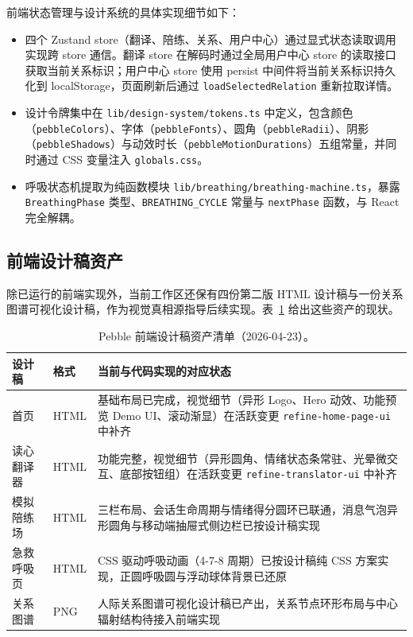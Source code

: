 前端状态管理与设计系统的具体实现细节如下：

\begin{itemize}
  \item 四个 Zustand store（翻译、陪练、关系、用户中心）通过显式状态读取调用实现跨 store 通信。翻译 store 在解码时通过全局用户中心 store 的读取接口获取当前关系标识；用户中心 store 使用 persist 中间件将当前关系标识持久化到 localStorage，页面刷新后通过 \texttt{loadSelectedRelation} 重新拉取详情。
  \item 设计令牌集中在 \texttt{lib/design-system/tokens.ts} 中定义，包含颜色（\texttt{pebbleColors}）、字体（\texttt{pebbleFonts}）、圆角（\texttt{pebbleRadii}）、阴影（\texttt{pebbleShadows}）与动效时长（\texttt{pebbleMotionDurations}）五组常量，并同时通过 CSS 变量注入 \texttt{globals.css}。
  \item 呼吸状态机提取为纯函数模块 \texttt{lib/breathing/breathing-machine.ts}，暴露 \texttt{BreathingPhase} 类型、\texttt{BREATHING\_CYCLE} 常量与 \texttt{nextPhase} 函数，与 React 完全解耦。
\end{itemize}

\subsection{前端设计稿资产}

除已运行的前端实现外，当前工作区还保有四份第二版 HTML 设计稿与一份关系图谱可视化设计稿，作为视觉真相源指导后续实现。表~\ref{tab:pebble-design-assets} 给出这些资产的现状。

\begin{table}[H]
  \centering
  \caption{Pebble 前端设计稿资产清单（2026-04-23）。}
  \label{tab:pebble-design-assets}
  \begin{tabularx}{\textwidth}{>{\raggedright\arraybackslash}p{3.2cm} >{\raggedright\arraybackslash}p{2.4cm} >{\raggedright\arraybackslash}X}
    \toprule
    设计稿 & 格式 & 当前与代码实现的对应状态 \\
    \midrule
    首页 & HTML & 基础布局已完成，视觉细节（异形 Logo、Hero 动效、功能预览 Demo UI、滚动渐显）在活跃变更 \texttt{refine-home-page-ui} 中补齐 \\
    读心翻译器 & HTML & 功能完整，视觉细节（异形圆角、情绪状态条常驻、光晕微交互、底部按钮组）在活跃变更 \texttt{refine-translator-ui} 中补齐 \\
    模拟陪练场 & HTML & 三栏布局、会话生命周期与情绪得分圆环已联通，消息气泡异形圆角与移动端抽屉式侧边栏已按设计稿实现 \\
    急救呼吸页 & HTML & CSS 驱动呼吸动画（4-7-8 周期）已按设计稿纯 CSS 方案实现，正圆呼吸圆与浮动球体背景已还原 \\
    关系图谱 & PNG & 人际关系图谱可视化设计稿已产出，关系节点环形布局与中心辐射结构待接入前端实现 \\
    \bottomrule
  \end{tabularx}
\end{table}

